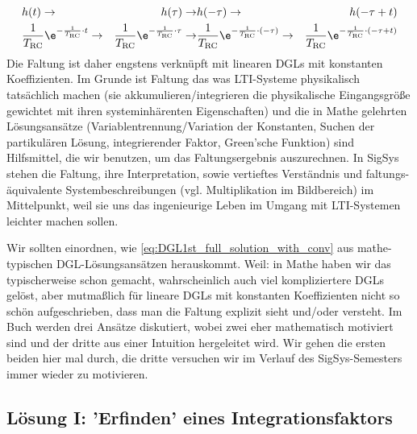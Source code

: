 \begin{align}
&h(t)\rightarrow &h(\tau)\rightarrow &h(-\tau)\rightarrow &h(-\tau + t)\\
&\frac{1}{\TRC} \e^{-\frac{1}{\TRC} \cdot t}\rightarrow
&\frac{1}{\TRC} \e^{-\frac{1}{\TRC} \cdot \tau} \rightarrow
&\frac{1}{\TRC} \e^{-\frac{1}{\TRC} \cdot (-\tau)}\rightarrow
&\frac{1}{\TRC} \e^{-\frac{1}{\TRC} \cdot (-\tau+t)}
\end{align}
%
Die Faltung ist daher engstens verknüpft mit linearen DGLs mit konstanten Koeffizienten. Im Grunde ist Faltung das was LTI-Systeme physikalisch tatsächlich machen (sie akkumulieren/integrieren die physikalische Eingangsgröße gewichtet mit ihren systeminhärenten Eigenschaften) und die in Mathe gelehrten Lösungsansätze (Variablentrennung/Variation der Konstanten, Suchen der partikulären Lösung, integrierender Faktor, Green'sche Funktion) sind Hilfsmittel, die wir benutzen, um das Faltungsergebnis auszurechnen.
%
In SigSys stehen die Faltung, ihre Interpretation, sowie vertieftes Verständnis und faltungs-äquivalente Systembeschreibungen (vgl. Multiplikation im Bildbereich) im Mittelpunkt, weil sie uns das ingenieurige Leben im Umgang mit LTI-Systemen leichter machen sollen.

Wir sollten einordnen, wie \eqref{eq:DGL1st_full_solution_with_conv} aus mathe-typischen DGL-Lösungsansätzen herauskommt. Weil: in Mathe haben wir das typischerweise schon gemacht, wahrscheinlich auch viel kompliziertere DGLs gelöst, aber mutmaßlich für lineare DGLs mit konstanten Koeffizienten nicht so schön aufgeschrieben, dass man die Faltung explizit sieht und/oder versteht.
%
Im Buch \cite[Kap. 1.6]{Strang2014} werden drei Ansätze diskutiert, wobei zwei eher mathematisch motiviert sind und der dritte aus einer Intuition hergeleitet wird. Wir gehen die ersten beiden hier mal durch, die dritte versuchen wir im Verlauf des SigSys-Semesters immer wieder zu motivieren.

\subsection*{Lösung I: 'Erfinden' eines Integrationsfaktors}


